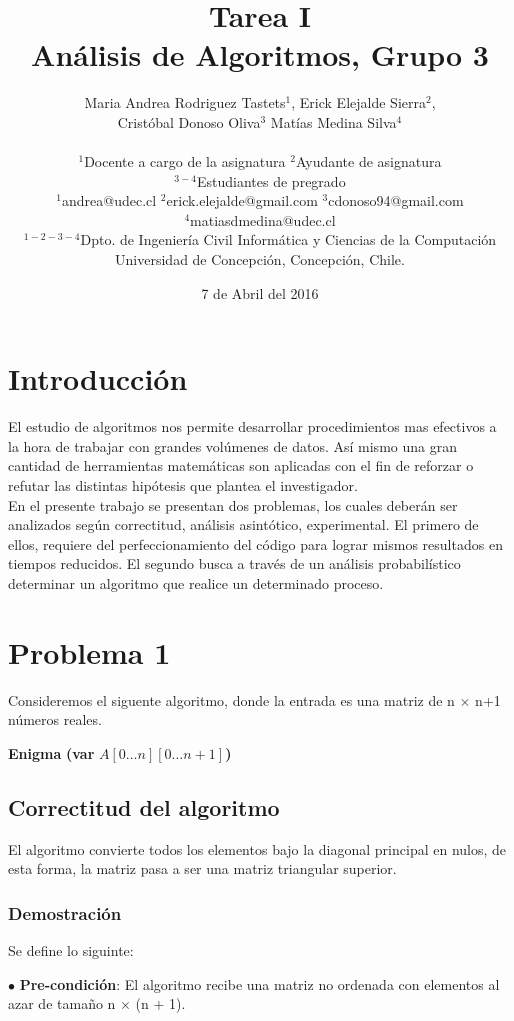 \documentclass[11pt]{article}
\title{Tarea I\\ \small{Análisis de Algoritmos, Grupo 3}}
\author{
Maria Andrea Rodriguez Tastets$^{1}$, Erick Elejalde Sierra$^{2}$,\\ Cristóbal Donoso Oliva$^{3}$ Matías Medina Silva$^{4}$\\\\
\small{$^{1}$Docente a cargo de la asignatura $^{2}$Ayudante de asignatura}\\
\small{$^{3-4}$Estudiantes de pregrado}\\
\small{$^{1}$andrea@udec.cl $^{2}$erick.elejalde@gmail.com $^{3}$cdonoso94@gmail.com }\\
\small{$^{4}$matiasdmedina@udec.cl}\\
\small{$^{1-2-3-4}$Dpto. de Ingeniería Civil Informática y Ciencias de la Computación}\\
\small{Universidad de Concepción, Concepción, Chile.}\\
}
\date{7 de Abril del 2016}
\begin{document}
\maketitle
\newpage
\tableofcontents
\newpage
\section{Introducción}
El estudio de algoritmos nos permite desarrollar procedimientos mas efectivos a la hora de trabajar  con grandes volúmenes de datos. Así mismo una gran cantidad de herramientas matemáticas son aplicadas  con el fin de reforzar o refutar las distintas hipótesis que plantea el  investigador.\\En el presente trabajo se presentan dos problemas, los cuales deberán ser analizados según correctitud, análisis asintótico, experimental. El primero de ellos, requiere del perfeccionamiento del código para lograr mismos resultados en tiempos reducidos. El segundo busca a través de un análisis probabilístico determinar un algoritmo que realice un determinado proceso.



\section{Problema 1}
Consideremos el siguente algoritmo, donde la entrada es una matriz de n $\times$ n+1 números reales.

\begin{algorithm}[H]
\caption{\textbf{Enigma }\textbf{(var} $A[0 \dots n][0 \dots n + 1]$\textbf{)}}
\end{algorithm}
\subsection{Correctitud del algoritmo}
El algoritmo convierte todos los elementos bajo la diagonal principal en nulos, de esta forma, la matriz pasa a ser una matriz triangular superior.
\subsubsection{Demostración}
Se define lo siguinte:

$\bullet$ \textbf{Pre-condición}: El algoritmo recibe una matriz no ordenada con elementos al azar de tamaño  n $\times$ (n + 1).
\end{document}
